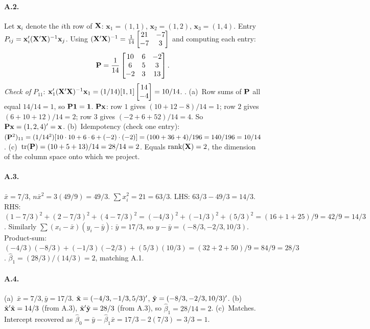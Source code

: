 \documentclass{article}
\begin{document}
\paragraph{A.2.}  Let $\bm x_i$ denote the $i$th row of ${\mathbf X}$: $\bm x_1 = (1, 1)$, $\bm x_2 = (1, 2)$, $\bm x_3 = (1, 4)$.  Entry $P_{ij} = \mathbf x_i'({\mathbf X}'{\mathbf X})^{-1}\mathbf x_j$.  Using $({\mathbf X}'{\mathbf X})^{-1} = \frac{1}{14}\begin{bmatrix}21 & -7\\ -7 & 3\end{bmatrix}$ and computing each entry:
$${\mathbf P} = \frac{1}{14}\begin{bmatrix}10 & 6 & -2\\ 6 & 5 & 3\\ -2 & 3 & 13\end{bmatrix}.$$
\emph{Check of } $P_{11}$: $\mathbf x_1'({\mathbf X}'{\mathbf X})^{-1}\mathbf x_1 = (1/14)[1, 1]\begin{bmatrix}14\\ -4\end{bmatrix} = 10/14$.  \checkmark.  (a)~Row sums of ${\mathbf P}$ all equal $14/14 = 1$, so ${\mathbf P}\mathbf 1 = \mathbf 1$.  ${\mathbf P}{\mathbf x}$: row $1$ gives $(10 + 12 - 8)/14 = 1$; row $2$ gives $(6 + 10 + 12)/14 = 2$; row $3$ gives $(-2 + 6 + 52)/14 = 4$.  So ${\mathbf P}{\mathbf x} = (1, 2, 4)' = {\mathbf x}$.  (b)~Idempotency (check one entry): $({\mathbf P}^2)_{11} = (1/14^2)[10\cdot 10 + 6\cdot 6 + (-2)\cdot(-2)] = (100 + 36 + 4)/196 = 140/196 = 10/14$. \checkmark  (c)~$\text{tr}({\mathbf P}) = (10 + 5 + 13)/14 = 28/14 = 2$.  Equals $\text{rank}({\mathbf X}) = 2$, the dimension of the column space onto which we project.

\paragraph{A.3.}  $\bar x = 7/3$, $n\bar x^2 = 3(49/9) = 49/3$.  $\sum x_i^2 = 21 = 63/3$.  LHS: $63/3 - 49/3 = 14/3$.  RHS: $(1 - 7/3)^2 + (2 - 7/3)^2 + (4 - 7/3)^2 = (-4/3)^2 + (-1/3)^2 + (5/3)^2 = (16 + 1 + 25)/9 = 42/9 = 14/3$.  \checkmark  Similarly $\sum(x_i - \bar x)(y_i - \bar y)$: $\bar y = 17/3$, so $y - \bar y = (-8/3, -2/3, 10/3)$.  Product-sum: $(-4/3)(-8/3) + (-1/3)(-2/3) + (5/3)(10/3) = (32 + 2 + 50)/9 = 84/9 = 28/3$.  $\hat\beta_1 = (28/3)/(14/3) = 2$, matching A.1.

\paragraph{A.4.}  (a)~$\bar x = 7/3, \bar y = 17/3$.  $\tilde{{\mathbf x}} = (-4/3, -1/3, 5/3)'$, $\tilde{{\mathbf y}} = (-8/3, -2/3, 10/3)'$.  (b)~$\tilde{{\mathbf x}}'\tilde{{\mathbf x}} = 14/3$ (from A.3), $\tilde{{\mathbf x}}'\tilde{{\mathbf y}} = 28/3$ (from A.3), so $\hat\beta_1 = 28/14 = 2$.  (c)~Matches.  Intercept recovered as $\hat\beta_0 = \bar y - \hat\beta_1\bar x = 17/3 - 2(7/3) = 3/3 = 1$.
\end{document}
